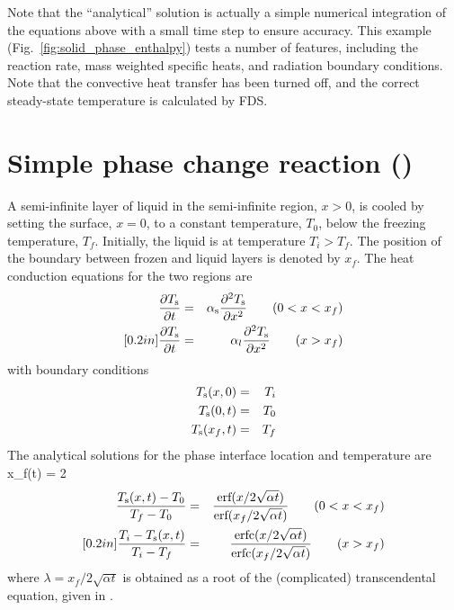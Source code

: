 \documentclass[11pt]{book}
\begin{document}
\noindent
Note that the ``analytical'' solution is actually a simple numerical integration of the equations above with a small time step to ensure accuracy.
This example (Fig.~\ref{fig:solid_phase_enthalpy}) tests a number of features, including the reaction rate, mass weighted specific heats, and radiation boundary conditions. Note that the
convective heat transfer has been turned off, and the correct steady-state temperature is calculated by FDS.

\clearpage


\section{Simple phase change reaction (\texorpdfstring{}{pcm\_slab})}

A semi-infinite layer of liquid in the semi-infinite region, $x>0$,
is cooled by setting the surface, $x=0$, to a constant temperature, $T_0$,
below the freezing temperature, $T_f$. Initially, the liquid is at temperature $T_i > T_f$. The position of the boundary between frozen and liquid layers
is denoted by $x_f$. The heat conduction equations for the two regions are
\begin{eqnarray}
\frac{\partial T_{\rm s}}{\partial t} & = & \alpha_{\rm s} \frac{\partial^2 T_{\rm s}}{\partial x^2} \quad \quad (0 < x < x_f) \\ [0.2in]
\frac{\partial T_{\rm s}}{\partial t} & = & \alpha_l \frac{\partial^2 T_{\rm s}}{\partial x^2} \quad \quad (x > x_f)
\end{eqnarray}
with boundary conditions
\begin{eqnarray}
T_{\rm s}(x,0)   &= & T_i \nonumber \\
T_{\rm s}(0,t)   &= & T_0 \nonumber \\
T_{\rm s}(x_f,t) &= & T_f \nonumber
\end{eqnarray}
The analytical solutions for the phase interface location and temperature are \cite{Carslaw:1}
\be
x_f(t) = 2 \lambda {}
\ee
\begin{eqnarray}
\frac{T_{\rm s}(x,t)-T_0}{T_f - T_0} &=& \frac{\hbox{erf}(x/2\sqrt{\alpha t})} {\hbox{erf} (x_f/2\sqrt{\alpha t})} \quad \quad (0 < x < x_f) \\ [0.2in]
\frac{T_i-T_{\rm s}(x,t)}{T_i - T_f} &=& \frac{\hbox{erfc}(x/2\sqrt{\alpha t})}{\hbox{erfc}(x_f/2\sqrt{\alpha t})} \quad \quad (x > x_f)
\end{eqnarray}
where $\lambda = x_f /2\sqrt{\alpha t}$ is obtained as a root of the (complicated)
transcendental equation, given in \cite{Carslaw:1}.
\end{document}
